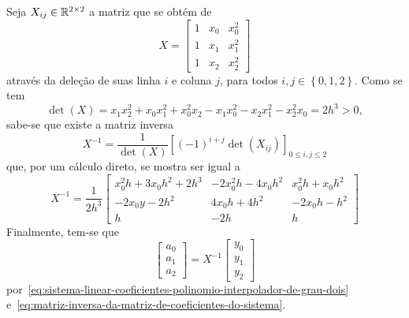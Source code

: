 Seja \(X_{ij}\in\mathbb{R}^{2\times{2}}\) a matriz que se obtém de
\begin{equation*}
  X=
  \begin{bmatrix}
    1 & x_{0} & x_{0}^{2} \\
    1 & x_{1} & x_{1}^{2} \\
    1 & x_{2} & x_{2}^{2}
  \end{bmatrix}
\end{equation*}
através da deleção de suas linha \(i\) e coluna \(j\), para todos
\(i,j\in\left\{0,1,2\right\}\). Como se tem
\begin{equation*}
  \det{\left(X\right)}
  =
  x_{1}x_{2}^{2}+x_{0}x_{1}^{2}+x_{0}^{2}x_{2}
  -x_{1}x_{0}^{2}-x_{2}x_{1}^{2}-x_{2}^{2}x_{0}
  =2h^{3}>0,
\end{equation*}
sabe-se que existe a matriz inversa
\begin{equation*}
  X^{-1}=\frac{1}{\det{\left(X\right)}}\left[(-1)^{i+j}\det{\left(X_{ij}\right)}\right]_{0\leqslant{i,j}\leqslant{2}}
\end{equation*}
que, por um cálculo direto, se mostra ser igual a
\begin{equation}\label{eq:matriz-inversa-da-matriz-de-coeficientes-do-sistema}
  X^{-1}
  =
  \frac{1}{2h^{3}}
  \begin{bmatrix}
    x_{0}^{2}h+3x_{0}h^{2}+2h^{3} & -2x_{0}^{2}h-4x_{0}h^{2} & x_{0}^{2}h+x_{0}h^{2} \\
    -2x_{0}y-2h^{2}               & 4x_{0}h+4h^{2}           & -2x_{0}h-h^{2}        \\
    h                             & -2h                      & h
  \end{bmatrix}
\end{equation}
Finalmente, tem-se que
\begin{equation}\label{eq:coeficientes-do-polinomio-interpolador-de-grau-dois}
  \begin{bmatrix}
    a_{0} \\ a_{1} \\ a_{2}
  \end{bmatrix}
  =
  X^{-1}
  \begin{bmatrix}
    y_{0} \\ y_{1} \\ y_{2}
  \end{bmatrix}
\end{equation}
por~\eqref{eq:sistema-linear-coeficientes-polinomio-interpolador-de-grau-dois}
e~\eqref{eq:matriz-inversa-da-matriz-de-coeficientes-do-sistema}.
